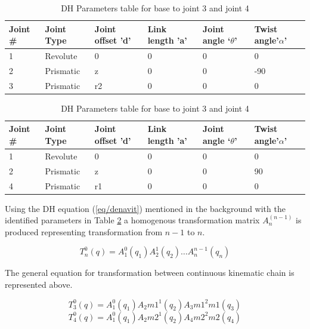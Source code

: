 \documentclass{UoNMCHA}
\numberwithin{equation}{section}
\begin{document}
	\begin{table}[H] \centering 
		\caption{DH Parameters table for base to joint 3 and joint 4}
		\begin{tabular}{llllll}
			\hline
			Joint \# & Joint Type & Joint offset 'd' & Link length 'a' & Joint angle ‘$\theta$’ & Twist angle'$\alpha$' \\ \hline
			1        & Revolute   & 0                & 0               & 0               & 0              \\
			2        & Prismatic  & z                & 0               & 0              & -90            \\
			3        & Prismatic  & r2               & 0               & 0               & 0             
		\end{tabular} \vspace{5mm}
		
		\begin{tabular}{llllll}
			\hline
			Joint \# & Joint Type & Joint offset 'd' & Link length 'a' & Joint angle ‘$\theta$’ & Twist angle'$\alpha$' \\ \hline
			1        & Revolute   & 0                & 0               & 0               & 0              \\
			2        & Prismatic  & z                & 0               & 0              & 90            \\
			4        & Prismatic  & r1               & 0               & 0               & 0             
		\end{tabular}
		\label{tab/joints}
	\end{table}
	
	
	Using the DH equation (\ref{eq/denavit}) mentioned in the background with the identified parameters in Table \ref{tab/joints} a homogenous transformation matrix $A_{n}^(n-1)$ is produced representing transformation from $n-1$ to $n$. 
	
	\begin{equation}
	T_n^0 (q)=A_1^0 (q_1 ) A_2^1 (q_2 ) \dots A_{n}^{n-1} (q_n )
	\end{equation}
	
	The general equation for transformation between continuous kinematic chain is represented above.
	
	\begin{equation}
	T_3^0 (q)=A_1^0 (q_1 ) A_2m1^1 (q_2 ) A_3m1^2m1 (q_3 )
	\end{equation}
	\begin{equation}
	T_4^0 (q)=A_1^0 (q_1 ) A_2m2^1 (q_2 ) A_4m2^2m2 (q_4 )
	\end{equation}
	
\end{document}
